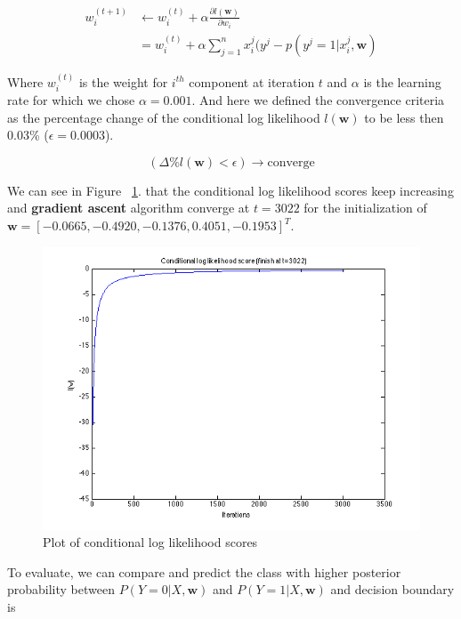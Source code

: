 \documentclass[a4paper]{article}
\begin{document}
	\begin{align}
		w_i^{(t+1)} &\leftarrow w_i^{(t)} + \alpha \frac{\partial l(\mathbf{w})}{\partial w_i} \\
			&= w_i^{(t)} + \alpha \sum_{j=1}^n x_i^j(y^j - p(y^j=1|x_i^j, \mathbf{w})
	\end{align}
	
	Where $w_i^{(t)}$ is the weight for $i^{th}$ component at iteration $t$ and $\alpha$ is the learning rate for which we chose $\alpha = 0.001$. And here we defined the convergence criteria as the percentage change of the conditional log likelihood $l(\mathbf{w})$ to be less then 0.03\% ($\epsilon = 0.0003$).
	
	\begin{equation}
		(\Delta \%l(\mathbf{w}) < \epsilon) \to \text{converge}
	\end{equation}
	
	We can see in Figure ~\ref{fig:gradient_ascent}. that the conditional log likelihood scores keep increasing and \textbf{gradient ascent} algorithm converge at $t=3022$ for the initialization of $\mathbf{w} = [-0.0665, -0.4920, -0.1376, 0.4051, -0.1953]^T$.
	
	\begin{figure}[H]
		\centering
		\includegraphics[scale=.57]{images/gradient_ascent.png}
		\caption{Plot of conditional log likelihood scores}
		\label{fig:gradient_ascent}
	\end{figure}
	
	To evaluate, we can compare and predict the class with higher posterior probability between $P(Y=0|X, \mathbf{w})$ and $P(Y=1|X, \mathbf{w})$ and decision boundary is
		
\end{document}
